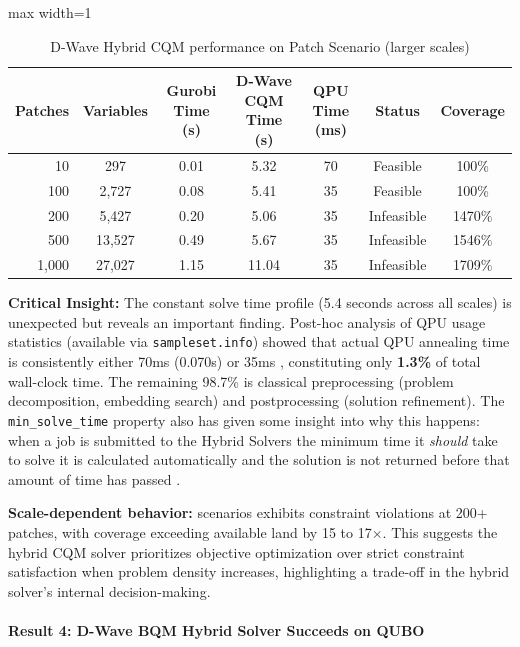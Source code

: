 \begin{table}[H]
\centering
\caption{D-Wave Hybrid CQM performance on Patch Scenario (larger scales)}
\label{tab:hybrid_cqm_patch}
\begin{adjustbox}{max width=1\textwidth}
\small
\begin{tabular}{rcccccc}
\toprule
\textbf{Patches} & \textbf{Variables} & \textbf{Gurobi Time (s)} & \textbf{D-Wave CQM Time (s)} & \textbf{QPU Time (ms)} & \textbf{Status} & \textbf{Coverage} \\
\midrule
10 & 297 & 0.01 & 5.32 & 70 & Feasible & 100\% \\
100 & 2,727 & 0.08 & 5.41 & 35 & Feasible & 100\% \\
200 & 5,427 & 0.20 & 5.06 & 35 & Infeasible & 1470\% \\
500 & 13,527 & 0.49 & 5.67 & 35 & Infeasible & 1546\% \\
1,000 & 27,027 & 1.15 & 11.04 & 35 & Infeasible & 1709\% \\
\bottomrule
\end{tabular}
\end{adjustbox}
\end{table}

\textbf{Critical Insight:} The constant solve time profile (5.4 seconds across all scales) is unexpected but reveals an important finding. Post-hoc analysis of QPU usage statistics (available via \texttt{sampleset.info}) showed that actual QPU annealing time is consistently either 70ms (0.070s) or 35ms , constituting only \textbf{1.3\%} of total wall-clock time. The remaining 98.7\% is classical preprocessing (problem decomposition, embedding search) and postprocessing (solution refinement). The \texttt{min\_solve\_time} property also has given some insight into why this happens: when a job is submitted to the Hybrid Solvers the minimum time it \textit{should} take to solve it is calculated automatically and the solution is not returned before that amount of time has passed \cite{dwave:solver_properties_all}.

\textbf{Scale-dependent behavior:} scenarios exhibits constraint violations at 200+ patches, with coverage exceeding available land by 15 to 17$\times$. This suggests the hybrid CQM solver prioritizes objective optimization over strict constraint satisfaction when problem density increases, highlighting a trade-off in the hybrid solver's internal decision-making.

\paragraph{Result 4: D-Wave BQM Hybrid Solver Succeeds on QUBO}

